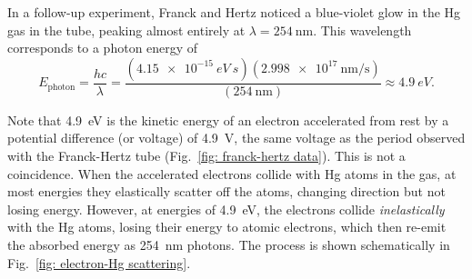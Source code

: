 \documentclass[addpoints]{physlabs} %
\begin{document}
\begin{labsection}
\begin{theory}
    In a follow-up experiment, Franck and Hertz noticed a blue-violet glow in the Hg gas in the tube, peaking almost entirely at $\lambda=\qty{254}{\nano\meter}$. This wavelength corresponds to a photon energy of
    \[
        E_\text{photon} = \frac{hc}{\lambda} = \frac{(\qty{4.15e-15}{eV~s})(\qty{2.998e17}{\nano\meter/\second})}{(\qty{254}{\nano\meter})} \approx \qty{4.9}{eV}.
    \]
    
    Note that \qty{4.9}{eV} is the kinetic energy of an electron accelerated from rest by a potential difference (or voltage) of \qty{4.9}{\volt}, the same voltage as the period observed with the Franck-Hertz tube (Fig.~\ref{fig: franck-hertz data}). This is not a coincidence. When the accelerated electrons collide with Hg atoms in the gas, at most energies they elastically scatter off the atoms, changing direction but not losing energy. However, at energies of \qty{4.9}{eV}, the electrons collide {\sl inelastically} with the Hg atoms, losing their energy to atomic electrons, which then re-emit the absorbed energy as \qty{254}{\nano\meter} photons. The process is shown schematically in Fig.~\ref{fig: electron-Hg scattering}.
    

\end{theory}
\end{labsection}
\end{document}
